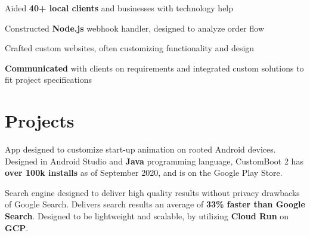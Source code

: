 \documentclass[letterpaper]{deedy-resume} %
\begin{document}
\begin{minipage}[t]{0.66\textwidth}
\sectionspace %


\begin{tightitemize}
\item Aided \textbf{40+ local clients} and businesses with technology help
\item Constructed \textbf{Node.js} webhook handler, designed to analyze order flow
\item Crafted custom websites, often customizing functionality and design
\item \textbf{Communicated} with clients on requirements and integrated custom solutions to fit project specifications
\end{tightitemize}

\sectionspace %







\section{Projects}


App designed to customize start-up animation on rooted Android devices. Designed in Android Studio and \textbf{Java} programming language, CustomBoot 2 has \textbf{over 100k installs} as of September 2020, and is on the Google Play Store.

\sectionspace %

Search engine designed to deliver high quality results without privacy drawbacks of Google Search. Delivers search results an average of \textbf{33\% faster than Google Search}. Designed to be lightweight and scalable, by utilizing \textbf{Cloud Run} on \textbf{GCP}.


\end{minipage}
\end{document}
